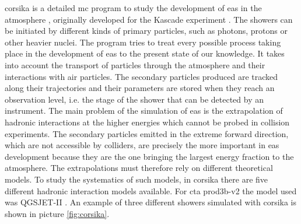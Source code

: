 \documentclass[main.tex]{subfiles}
\begin{document}
\gls{corsika} is a detailed \gls{mc} program to study the development of \gls{eas} in the atmosphere \cite{1998Corsika}, originally developed for the Kascade experiment \cite{1997Kascade}. The showers can be initiated by different kinds of primary particles, such as photons, protons or other heavier nuclei. The program tries to treat every possible process taking place in the development of \gls{eas} to the present state of our knowledge. It takes into account the transport of particles through the atmosphere and their interactions with air particles. The secondary particles produced are tracked along their trajectories and their parameters are stored when they reach an observation level, i.e. the stage of the shower that can be detected by an instrument. The main problem of the simulation of \gls{eas} is the extrapolation of hadronic interactions at the higher energies which cannot be probed in collision experiments. The secondary particles emitted in the extreme forward direction, which are not accessible by colliders, are precisely the more important in \gls{eas} development because they are the one bringing the largest energy fraction to the atmosphere. The extrapolations must therefore rely on different theoretical models. To study the systematics of such models, in \gls{corsika} there are five different hadronic interaction models available. For \gls{cta} prod3b-v2 the model used was QGSJET-II \cite{2006QGSJET}. An example of three different showers simulated with \gls{corsika} is shown in picture \ref{fig:corsika}.
\end{document}
